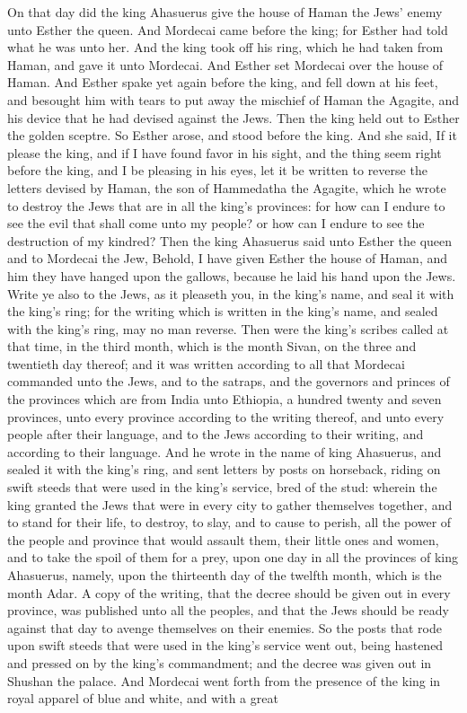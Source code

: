 On that day did the king Ahasuerus give the house of Haman the Jews’ enemy unto Esther the queen. And Mordecai came before the king; for Esther had told what he was unto her. And the king took off his ring, which he had taken from Haman, and gave it unto Mordecai. And Esther set Mordecai over the house of Haman.  And Esther spake yet again before the king, and fell down at his feet, and besought him with tears to put away the mischief of Haman the Agagite, and his device that he had devised against the Jews. Then the king held out to Esther the golden sceptre. So Esther arose, and stood before the king. And she said, If it please the king, and if I have found favor in his sight, and the thing seem right before the king, and I be pleasing in his eyes, let it be written to reverse the letters devised by Haman, the son of Hammedatha the Agagite, which he wrote to destroy the Jews that are in all the king’s provinces: for how can I endure to see the evil that shall come unto my people? or how can I endure to see the destruction of my kindred? Then the king Ahasuerus said unto Esther the queen and to Mordecai the Jew, Behold, I have given Esther the house of Haman, and him they have hanged upon the gallows, because he laid his hand upon the Jews. Write ye also to the Jews, as it pleaseth you, in the king’s name, and seal it with the king’s ring; for the writing which is written in the king’s name, and sealed with the king’s ring, may no man reverse.  Then were the king’s scribes called at that time, in the third month, which is the month Sivan, on the three and twentieth day thereof; and it was written according to all that Mordecai commanded unto the Jews, and to the satraps, and the governors and princes of the provinces which are from India unto Ethiopia, a hundred twenty and seven provinces, unto every province according to the writing thereof, and unto every people after their language, and to the Jews according to their writing, and according to their language. And he wrote in the name of king Ahasuerus, and sealed it with the king’s ring, and sent letters by posts on horseback, riding on swift steeds that were used in the king’s service, bred of the stud: wherein the king granted the Jews that were in every city to gather themselves together, and to stand for their life, to destroy, to slay, and to cause to perish, all the power of the people and province that would assault them, their little ones and women, and to take the spoil of them for a prey, upon one day in all the provinces of king Ahasuerus, namely, upon the thirteenth day of the twelfth month, which is the month Adar. A copy of the writing, that the decree should be given out in every province, was published unto all the peoples, and that the Jews should be ready against that day to avenge themselves on their enemies. So the posts that rode upon swift steeds that were used in the king’s service went out, being hastened and pressed on by the king’s commandment; and the decree was given out in Shushan the palace.  And Mordecai went forth from the presence of the king in royal apparel of blue and white, and with a great 